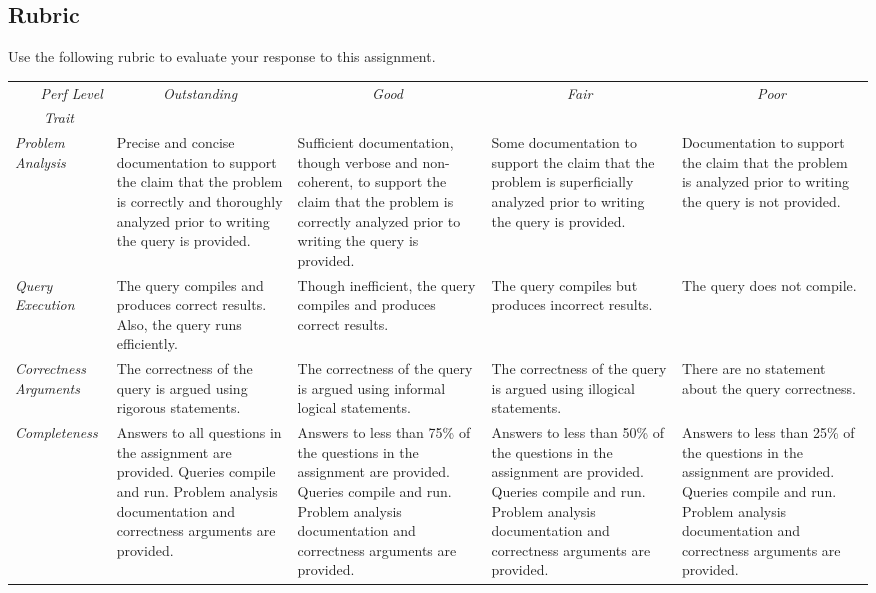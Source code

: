 \documentclass[11pt]{article}
\begin{document}
\begin{landscape}

\section{Rubric} \label{sec:Rubric}

Use the following rubric to evaluate your response to this assignment.

\vspace*{0.15in}

\begin{tabular}{p{1.2in}p{1.5in}p{1.5in}p{1.5in}p{1.5in}} \toprule
\multicolumn{1}{r}{\emph{Perf Level}} & \multicolumn{1}{c}{\emph{Outstanding}} & \multicolumn{1}{c}{\emph{Good}} & \multicolumn{1}{c}{\emph{Fair}} & \multicolumn{1}{c}{\emph{Poor}} \\ 
\multicolumn{1}{c}{\emph{Trait}} & & & & \\ \midrule

\emph{Problem Analysis} &
Precise and concise documentation to support the claim that the problem is correctly and thoroughly analyzed prior to writing the query is provided. &
Sufficient documentation, though verbose and non-coherent, to support the claim that the problem is correctly analyzed prior to writing the query is provided. &
Some documentation to support the claim that the problem is superficially analyzed prior to writing the query is provided. &
Documentation to support the claim that the problem is analyzed prior to writing the query is not provided. \\ \midrule


\emph{Query Execution} & 
The query compiles and produces correct results. Also, the query runs efficiently. & 
Though inefficient, the query compiles and produces correct results. &
The query compiles but produces incorrect results. &
The query does not compile. \\ \midrule

\emph{Correctness Arguments} & 
The correctness of the query is argued using rigorous statements. &
The correctness of the query is argued using informal logical statements. &
The correctness of the query is argued using illogical  statements. &
There are no statement about the query correctness. \\ \midrule


\emph{Completeness} &
Answers to all questions in the assignment are provided. Queries compile and run. Problem analysis documentation and correctness arguments are provided. &
Answers to less than 75\% of the questions in the assignment are provided. Queries compile and run. Problem analysis documentation and correctness arguments are provided. &
Answers to less than 50\% of the questions in the assignment are provided. Queries compile and run. Problem analysis documentation and correctness arguments are provided. &
Answers to less than 25\% of the questions in the assignment are provided. Queries compile and run. Problem analysis documentation and correctness arguments are provided. \\ \bottomrule


\end{tabular}
\end{landscape}
\end{document}
